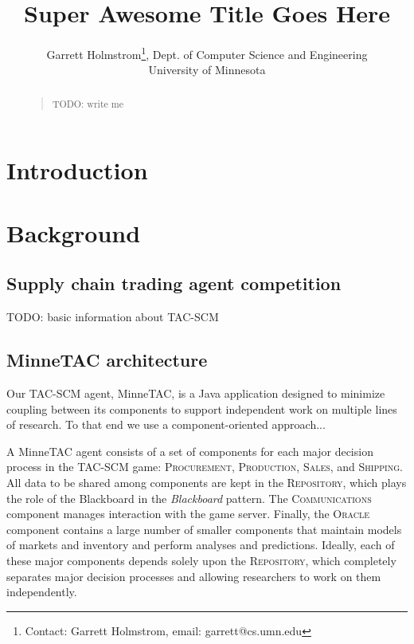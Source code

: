 \documentclass{article}
\begin{document}
\title{Super Awesome Title Goes Here}

\author{Garrett Holmstrom\thanks{Contact: Garrett Holmstrom, email: garrett@cs.umn.edu}, Dept. of Computer Science and Engineering \\ University of Minnesota
}

\date{}

\maketitle

\begin{abstract}
\begin{quote}
TODO:  write me
\end{quote}
\end{abstract}

\section{Introduction}

\section{Background}

\subsection{Supply chain trading agent competition}
TODO:  basic information about TAC-SCM

\subsection{MinneTAC architecture}

Our TAC-SCM agent, MinneTAC, is a Java application designed to minimize coupling between its components to support independent work on multiple lines of research.  To that end we use a component-oriented approach...

A MinneTAC agent consists of a set of components for each major decision process in the TAC-SCM game:  \textsc{Procurement}, \textsc{Production}, \textsc{Sales}, and \textsc{Shipping}.
All data to be shared among components are kept in the \textsc{Repository}, which plays the role of the Blackboard in the \emph{Blackboard} pattern\cite{Busch96}.
The \textsc{Communications} component manages interaction with the game server.
Finally, the \textsc{Oracle} component contains a large number of smaller components that maintain models of markets and inventory and perform analyses and predictions.
Ideally, each of these major components depends solely upon the \textsc{Repository}, which completely separates major decision processes and allowing researchers to work on them independently.
\end{document}
